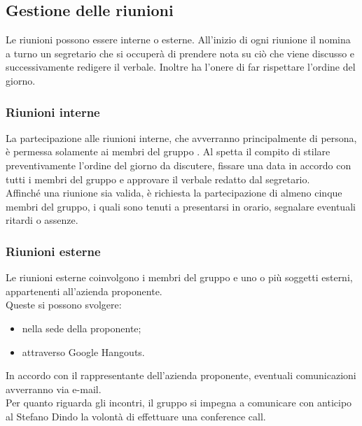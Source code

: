 \subsection{Gestione delle riunioni}
Le riunioni possono essere interne o esterne. All'inizio di ogni riunione il \roleProjectManager{} nomina a turno un segretario che si occuperà di prendere nota su ciò che viene discusso e successivamente redigere il verbale. 
Inoltre ha l'onere di far rispettare l'ordine del giorno.

\subsubsection{Riunioni interne}
La partecipazione alle riunioni interne, che avverranno principalmente di persona, è permessa solamente ai membri del gruppo \groupName{}. 
Al \roleProjectManager{} spetta il compito di stilare preventivamente l'ordine del giorno da discutere, fissare una data in accordo con tutti i membri del gruppo e approvare il verbale redatto dal segretario. \\
Affinché una riunione sia valida, è richiesta la partecipazione di almeno cinque membri del gruppo, i quali sono tenuti a presentarsi in orario, segnalare eventuali ritardi o assenze.

\subsubsection{Riunioni esterne}
Le riunioni esterne coinvolgono i membri del gruppo \groupName{} e uno o più soggetti esterni, appartenenti all'azienda proponente. \\
Queste si possono svolgere:
\begin{itemize}
    \item nella sede della proponente; 
    \item attraverso Google Hangouts.
\end{itemize}
In accordo con il rappresentante dell'azienda proponente, eventuali comunicazioni avverranno via e-mail. \\
Per quanto riguarda gli incontri, il gruppo si impegna a comunicare con anticipo al \roleProjectManager{} Stefano Dindo la volontà di effettuare una conference call.
